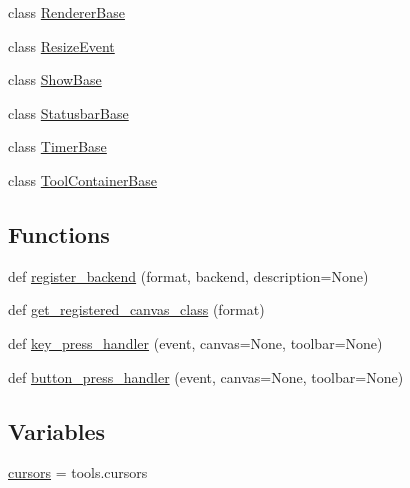 \begin{DoxyCompactItemize}
\item 
class \hyperlink{classmatplotlib_1_1backend__bases_1_1RendererBase}{Renderer\+Base}
\item 
class \hyperlink{classmatplotlib_1_1backend__bases_1_1ResizeEvent}{Resize\+Event}
\item 
class \hyperlink{classmatplotlib_1_1backend__bases_1_1ShowBase}{Show\+Base}
\item 
class \hyperlink{classmatplotlib_1_1backend__bases_1_1StatusbarBase}{Statusbar\+Base}
\item 
class \hyperlink{classmatplotlib_1_1backend__bases_1_1TimerBase}{Timer\+Base}
\item 
class \hyperlink{classmatplotlib_1_1backend__bases_1_1ToolContainerBase}{Tool\+Container\+Base}
\end{DoxyCompactItemize}
\subsection*{Functions}
\begin{DoxyCompactItemize}
\item 
def \hyperlink{namespacematplotlib_1_1backend__bases_a4a8cc05719bffc6db22eef463fb832e5}{register\+\_\+backend} (format, backend, description=None)
\item 
def \hyperlink{namespacematplotlib_1_1backend__bases_a57f84e94a9fac8a951a7a7e1c3bc4a6e}{get\+\_\+registered\+\_\+canvas\+\_\+class} (format)
\item 
def \hyperlink{namespacematplotlib_1_1backend__bases_a1ec45458122389c565d08445bf03b167}{key\+\_\+press\+\_\+handler} (event, canvas=None, toolbar=None)
\item 
def \hyperlink{namespacematplotlib_1_1backend__bases_a1eb12e49461e6fd3c786ee9817a0838e}{button\+\_\+press\+\_\+handler} (event, canvas=None, toolbar=None)
\end{DoxyCompactItemize}
\subsection*{Variables}
\begin{DoxyCompactItemize}
\item 
\hyperlink{namespacematplotlib_1_1backend__bases_adc161ae2cced74cf28308e01920a24c3}{cursors} = tools.\+cursors
\end{DoxyCompactItemize}


